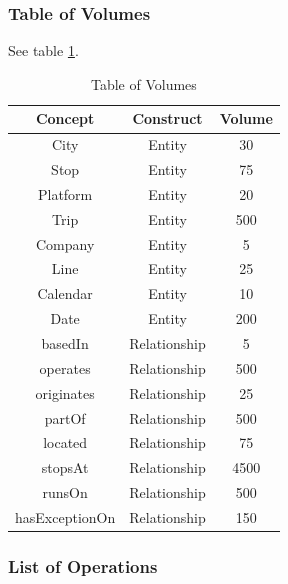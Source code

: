 	\subsubsection{Table of Volumes}
	
	See table \ref{tbl:volumes}.
	
	\begin{table}[h]
		\centering
		\begin{tabular}{|c|c|c|}
			\hline
			\textbf{Concept} & \textbf{Construct} & \textbf{Volume} \\
			\hline
			City & Entity & 30 \\ \hline
			Stop & Entity & 75 \\ \hline
			Platform & Entity & 20 \\ \hline
			Trip & Entity & 500 \\ \hline
			Company & Entity & 5 \\ \hline
			Line & Entity & 25 \\ \hline
			Calendar & Entity & 10 \\ \hline
			Date & Entity & 200 \\ \hline
			basedIn & Relationship & 5 \\ \hline
			operates & Relationship & 500 \\ \hline
			originates & Relationship & 25 \\ \hline
			partOf & Relationship & 500 \\ \hline
			located & Relationship & 75 \\ \hline
			stopsAt & Relationship & 4500 \\ \hline
			runsOn & Relationship & 500 \\ \hline
			hasExceptionOn & Relationship & 150 \\ \hline
		\end{tabular}
		\caption{Table of Volumes}\label{tbl:volumes}
	\end{table}

	\newpage
	\subsubsection{List of Operations}
	
